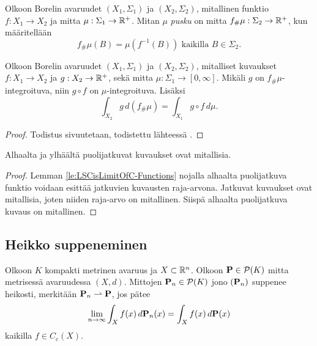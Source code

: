\documentclass[12pt,oneside,a4paper]{amsbook} %
\begin{document}
\begin{definition}
    Olkoon Borelin avaruudet $(X_1, \Sigma_1)$ ja $(X_2, \Sigma_2)$, mitallinen funktio $f:X_1 \to X_2$ ja mitta $\mu: \Sigma_1 \to \R^+$. Mitan $\mu$ \textit{pusku} on mitta $f_\#\mu: \Sigma_2 \to \R^+$, kun määritellään
    $$f_\# \mu (B) = \mu(f^{-1}(B)) \text{ kaikilla } B\in \Sigma_2.$$
\end{definition}

\begin{theorem}\label{thm:push-cov}
    Olkoon Borelin avaruudet $(X_1, \Sigma_1)$ ja $(X_2, \Sigma_2)$, mitalliset kuvaukset $f: X_1 \to X_2$ ja $g: X_2 \to \R^+$, sekä mitta $\mu:\Sigma_1 \to [0, \infty]$. Mikäli $g$ on $f_\#\mu$-integroituva, niin  $g \circ f$ on $\mu$-integroituva. Lisäksi
    \begin{equation*}
        \int_{X_2} g \, d(f_{\#} \mu) = \int_{X_1} g \circ f \, d\mu.
    \end{equation*}
\end{theorem}
\begin{proof}
Todistus sivuutetaan, todistettu lähteessä \cite[s. 190]{bogachev}.
\end{proof}

\begin{corollary}\label{co:LSCimpliesMeasurable}
    Alhaalta ja ylhäältä puolijatkuvat kuvaukset ovat mitallisia.
\end{corollary}
\begin{proof}
    Lemman \ref{le:LSCisLimitOfC-Functions} nojalla alhaalta puolijatkuva funktio voidaan esittää jatkuvien kuvausten raja-arvona. Jatkuvat kuvaukset ovat mitallisia, joten niiden raja-arvo on mitallinen. Siispä alhaalta puolijatkuva kuvaus on mitallinen. 
\end{proof}

\subsection{Heikko suppeneminen} 

\begin{definition} \label{def:weakConv}
    Olkoon $K$ kompakti metrinen avaruus ja $X\subset \R^n$. Olkoon $\P \in \mathcal{P}(K)$ mitta metrisessä avaruudessa $(X, d)$. Mittojen $\P_n \in \mathcal{P}(K)$ jono $(\P_n)$ suppenee heikosti, merkitään $\P_n \rightharpoonup \P$, jos pätee 
    \begin{equation*}
        \lim_{n\to\infty} \int_X f(x) \, d\P_n (x) = \int_X f(x) \, d\P(x)
    \end{equation*}
    kaikilla $f \in C_c(X)$.
\end{definition}
\end{document}
